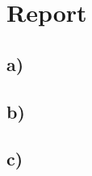 \documentclass[ngerman]{dis-template-add}
\begin{document}
\section*{Report}

\subsection*{a)}


\subsection*{b)}


\subsection*{c)}
\end{document}
